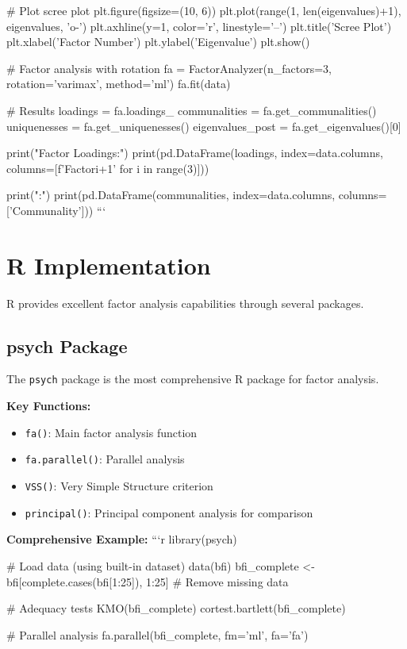 \documentclass[a4paper]{tufte-book}
\begin{document}
# Plot scree plot
plt.figure(figsize=(10, 6))
plt.plot(range(1, len(eigenvalues)+1), eigenvalues, 'o-')
plt.axhline(y=1, color='r', linestyle='--')
plt.title('Scree Plot')
plt.xlabel('Factor Number')
plt.ylabel('Eigenvalue')
plt.show()

# Factor analysis with rotation
fa = FactorAnalyzer(n_factors=3, rotation='varimax', method='ml')
fa.fit(data)

# Results
loadings = fa.loadings_
communalities = fa.get_communalities()
uniquenesses = fa.get_uniquenesses()
eigenvalues_post = fa.get_eigenvalues()[0]

print("Factor Loadings:")
print(pd.DataFrame(loadings, index=data.columns, 
                   columns=[f'Factor{i+1}' for i in range(3)]))

print("\nCommunalities:")
print(pd.DataFrame(communalities, index=data.columns, columns=['Communality']))
```

\section{R Implementation}

R provides excellent factor analysis capabilities through several packages.

\subsection{psych Package}

The \texttt{psych} package is the most comprehensive R package for factor analysis.

\textbf{Key Functions:}
\begin{itemize}
\item \texttt{fa()}: Main factor analysis function
\item \texttt{fa.parallel()}: Parallel analysis
\item \texttt{VSS()}: Very Simple Structure criterion
\item \texttt{principal()}: Principal component analysis for comparison
\end{itemize}

\textbf{Comprehensive Example:}
```r
library(psych)

# Load data (using built-in dataset)
data(bfi)
bfi_complete <- bfi[complete.cases(bfi[1:25]), 1:25]  # Remove missing data

# Adequacy tests
KMO(bfi_complete)
cortest.bartlett(bfi_complete)

# Parallel analysis
fa.parallel(bfi_complete, fm='ml', fa='fa')
\end{document}
